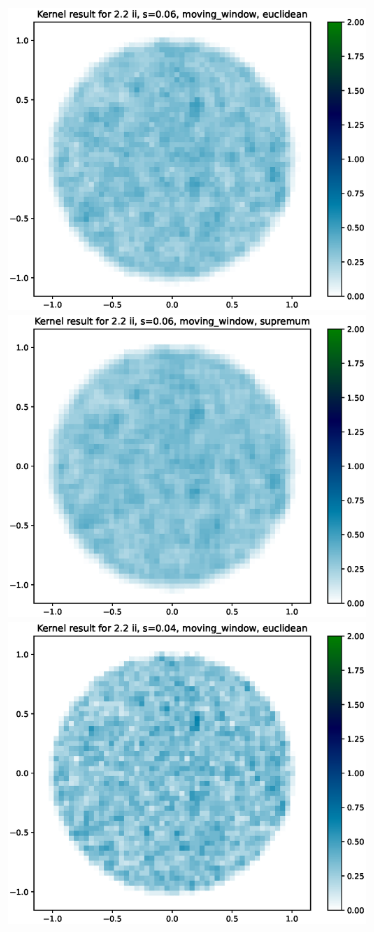 \documentclass{article}
\begin{document}
\hspace*{-1.5cm}\includegraphics[height=8cm]{comparisons//Kernel_result_2-2ii_s_0-06_moving_window_euclidean.eps} \hspace*{-1.5cm}
\includegraphics[height=8cm]{comparisons//Kernel_result_2-2ii_s_0-06_moving_window_supremum.eps}\\
\hspace*{-1.5cm}\includegraphics[height=8cm]{comparisons//Kernel_result_2-2ii_s_0-04_moving_window_euclidean.eps} \hspace*{-1.5cm}
\end{document}

